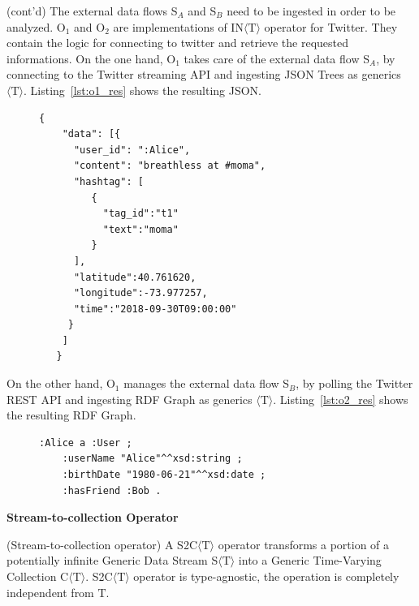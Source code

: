\begin{Example}
(cont'd) The external data flows S$_A$ and S$_B$ need to be ingested in order to be analyzed.
O$_1$ and O$_2$ are implementations of IN$\langle\mathrm{T}\rangle$ operator for Twitter. 
They contain the logic for connecting to twitter and retrieve the requested informations.
On the one hand, O$_1$ takes care of the external data flow S$_A$, by connecting to the Twitter streaming API and ingesting JSON Trees as generics $\langle\mathrm{T}\rangle$.
Listing~\ref{lst:o1_res} shows the resulting JSON.

\begin{figure}[ht]
\begin{minipage}{0.95\linewidth}
\begin{lstlisting}[caption={Example of the data resulting by the ingestion operation performed by O$_1$.},label=lst:o1_res,style=JSON]
  {
    "data": [{
      "user_id": ":Alice",
      "content": "breathless at #moma",
      "hashtag": [
         { 
           "tag_id":"t1"
           "text":"moma"
         }
      ],
      "latitude":40.761620,
      "longitude":-73.977257,
      "time":"2018-09-30T09:00:00"
     }
    ]
   }
\end{lstlisting}
\end{minipage}
\end{figure}

On the other hand, O$_1$ manages the external data flow S$_B$, by polling the Twitter REST API and ingesting RDF Graph as generics $\langle\mathrm{T}\rangle$.
Listing~\ref{lst:o2_res} shows the resulting RDF Graph.

\begin{figure}[ht]
\begin{minipage}{0.95\linewidth}
\begin{lstlisting}[caption={Example of the data resulting by the ingestion operation performed by O$_2$.},label=lst:o2_res,style=N3]
:Alice a :User ;
    :userName "Alice"^^xsd:string ;
    :birthDate "1980-06-21"^^xsd:date ;
    :hasFriend :Bob .
\end{lstlisting}
\end{minipage}
\end{figure}

\end{Example}

\medskip
\noindent
\textbf{Stream-to-collection Operator}
\medskip

\begin{Definition}
(Stream-to-collection operator) A S2C$\langle\mathrm{T}\rangle$ operator transforms a portion of a potentially infinite Generic Data Stream S$\langle\mathrm{T}\rangle$ into a Generic Time-Varying Collection C$\langle\mathrm{T}\rangle$.
S2C$\langle\mathrm{T}\rangle$ operator is type-agnostic, the operation is completely independent from $\mathrm{T}$.
\end{Definition}

